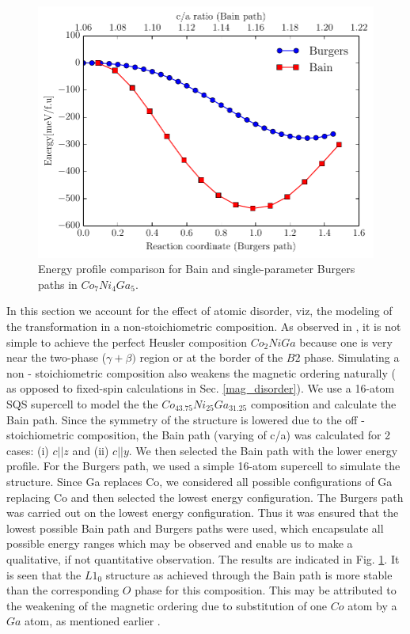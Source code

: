 \documentclass[%
preprint,
 amsmath,amssymb,
 aps,
prb,
showkeys,
]{revtex4-1}
\begin{document}
\begin{figure}[htp!]
  \includegraphics[scale=1.0]{figure_10}
  \caption{Energy profile comparison for Bain and single-parameter Burgers paths in   $Co_7Ni_4Ga_5$.}
  \label{fig:non_stoic}
\end{figure}
In this section we account for the effect of atomic disorder, viz, the modeling of the transformation in  a non-stoichiometric composition. As observed in \cite{siewert2010electronic}, it is not 
simple to  achieve the perfect Heusler composition $Co_2NiGa$  because one is very near the two-phase ($\gamma+\beta)$ region or at the border  of the $B2$ 
phase. Simulating a non - stoichiometric composition also weakens the magnetic ordering naturally ( as opposed to fixed-spin calculations in Sec. 
\ref{mag_disorder}). We use a 16-atom SQS supercell to model the the $Co_{43.75}Ni_{25}Ga_{31.25}$  composition and calculate the Bain path. Since the symmetry of the structure is lowered due to the off - stoichiometric composition, the Bain path (varying of c/a) was calculated for 2 cases: (i) $c || z$ and (ii) $c || y$.  We then selected the Bain path with the lower energy profile. For the Burgers path, we used a simple 16-atom supercell to simulate the structure. Since Ga replaces Co, we considered all possible configurations of Ga replacing Co and then selected the lowest energy configuration. The Burgers path was carried out on the lowest energy configuration.
Thus it was ensured that the lowest possible Bain path and Burgers paths were used, which encapsulate all possible energy ranges which may be observed and enable us to make a qualitative, if not quantitative observation.
The results are indicated in Fig. \ref{fig:non_stoic}. It is seen that the $L1_0$  structure as achieved through the Bain path is more stable than the corresponding $O$ phase for this composition. This may be attributed to the weakening of the magnetic ordering due to substitution of one $Co$ atom by a  $Ga$ atom, as mentioned earlier .
\end{document}
